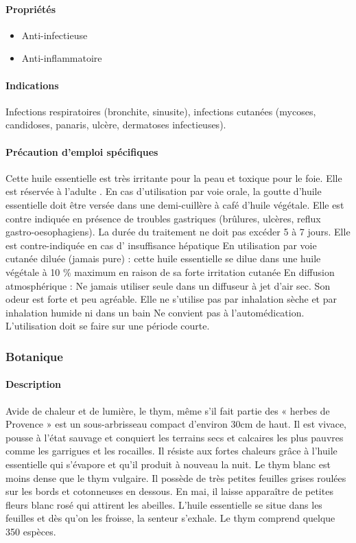 \documentclass[12pt,a4wide]{article}
\begin{document}
\paragraph{Propriétés}
\label{sec-4-11-1-2}
\begin{itemize}
\item Anti-infectieuse
\item Anti-inflammatoire
\end{itemize}

\paragraph{Indications}
\label{sec-4-11-1-3}
Infections respiratoires (bronchite, sinusite), infections cutanées (mycoses, candidoses, panaris, ulcère, dermatoses infectieuses).

\paragraph{Précaution d'emploi spécifiques}
\label{sec-4-11-1-4}

Cette huile essentielle est très irritante pour la peau et toxique pour le foie. Elle est réservée à l'adulte .
En cas d'utilisation par voie orale, la goutte d'huile essentielle doit être versée dans une demi-cuillère à café d'huile végétale. Elle est contre indiquée en présence de troubles gastriques (brûlures, ulcères, reflux gastro-oesophagiens). La durée du traitement ne doit pas excéder 5 à 7 jours. Elle est contre-indiquée en cas d' insuffisance hépatique
En utilisation par voie cutanée diluée (jamais pure) : cette huile essentielle se dilue dans une huile végétale à 10 \% maximum en raison de sa forte irritation cutanée
En diffusion atmosphérique : Ne jamais utiliser seule dans un diffuseur à jet d'air sec. Son odeur est forte et peu agréable.
Elle ne s'utilise pas par inhalation sèche et par inhalation humide ni dans un bain
Ne convient pas à l'automédication. L'utilisation doit se faire sur une période courte.

\subsubsection{Botanique}
\label{sec-4-11-2}

\paragraph{Description}
\label{sec-4-11-2-1}

Avide de chaleur et de lumière, le thym, même s'il fait partie des « herbes de Provence » est un sous-arbrisseau compact d'environ 30cm de haut. Il est vivace, pousse à l'état sauvage et conquiert les terrains secs et calcaires les plus pauvres comme les garrigues et les rocailles. Il résiste aux fortes chaleurs grâce à l'huile essentielle qui s'évapore et qu'il produit à nouveau la nuit. Le thym blanc est moins dense que le thym vulgaire. Il possède de très petites feuilles grises roulées sur les bords et cotonneuses en dessous. En mai, il laisse apparaître de petites fleurs blanc rosé qui attirent les abeilles.
L'huile essentielle se situe dans les feuilles et dès qu'on les froisse, la senteur s'exhale.
Le thym comprend quelque 350 espèces.
\end{document}
